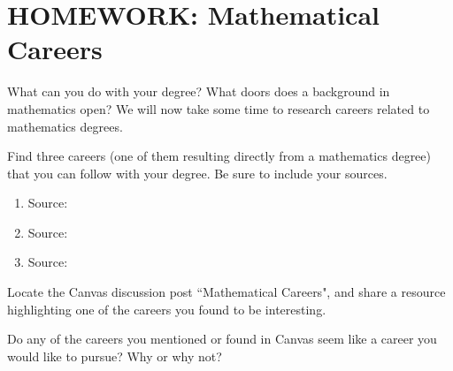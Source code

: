 
\section{HOMEWORK: Mathematical Careers}\label{careers}


What can you do with your degree? What doors does a background in mathematics open? We will now take some time to research careers related to mathematics degrees.

\begin{exercise}
Find three careers (one of them resulting directly from a mathematics degree) that you can follow with your degree. Be sure to include your sources.
\end{exercise}

\begin{enumerate}
    \item \hspace{1.5in} Source: \\
    \item \hspace{1.5in} Source: \\
    \item \hspace{1.5in} Source: 
\end{enumerate}

\begin{exercise}
Locate the Canvas discussion post ``Mathematical Careers", and share a resource highlighting one of the careers you found to be interesting.
\end{exercise}

\begin{exercise}
Do any of the careers you mentioned or found in Canvas seem like a career you would like to pursue? Why or why not?
\end{exercise}

\blanks
\blanks

